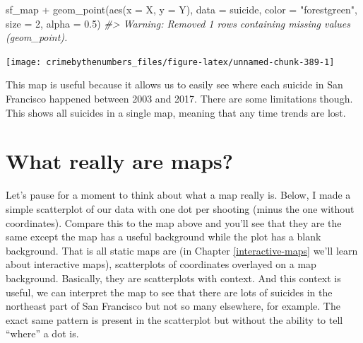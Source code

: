 \documentclass[
]{krantz}
\makeatletter
\newenvironment{Shaded}{\begin{snugshade}}{\end{snugshade}}
\newcommand{\AttributeTok}[1]{\textcolor[rgb]{0.61,0.61,0.61}{#1}}
\newcommand{\CommentTok}[1]{\textcolor[rgb]{0.37,0.37,0.37}{\textit{#1}}}
\newcommand{\DecValTok}[1]{\textcolor[rgb]{0.06,0.06,0.06}{#1}}
\newcommand{\FloatTok}[1]{\textcolor[rgb]{0.06,0.06,0.06}{#1}}
\newcommand{\FunctionTok}[1]{\textcolor[rgb]{0,0,0}{#1}}
\newcommand{\NormalTok}[1]{#1}
\newcommand{\SpecialCharTok}[1]{\textcolor[rgb]{0,0,0}{#1}}
\newcommand{\StringTok}[1]{\textcolor[rgb]{0.5,0.5,0.5}{#1}}
\newenvironment{kframe}{%
\medskip{}
\setlength{\fboxsep}{.8em}
 \def\at@end@of@kframe{}%
 \ifinner\ifhmode%
  \def\at@end@of@kframe{\end{minipage}}%
  \begin{minipage}{\columnwidth}%
 \fi\fi%
 \def\FrameCommand##1{\hskip\@totalleftmargin \hskip-\fboxsep
 \colorbox{shadecolor}{##1}\hskip-\fboxsep
     \hskip-\linewidth \hskip-\@totalleftmargin \hskip\columnwidth}%
 \MakeFramed {\advance\hsize-\width
   \@totalleftmargin\z@ \linewidth\hsize
   \@setminipage}}%
 {\par\unskip\endMakeFramed%
 \at@end@of@kframe}
\renewenvironment{Shaded}{\begin{kframe}}{\end{kframe}}
\makeatother
\begin{document}
\begin{Shaded}
\begin{Highlighting}[]
\NormalTok{sf\_map }\SpecialCharTok{+}
  \FunctionTok{geom\_point}\NormalTok{(}\FunctionTok{aes}\NormalTok{(}\AttributeTok{x =}\NormalTok{ X, }\AttributeTok{y =}\NormalTok{ Y),}
             \AttributeTok{data  =}\NormalTok{ suicide,}
             \AttributeTok{color =} \StringTok{"forestgreen"}\NormalTok{,}
             \AttributeTok{size  =} \DecValTok{2}\NormalTok{,}
             \AttributeTok{alpha =} \FloatTok{0.5}\NormalTok{)}
\CommentTok{\#\textgreater{} Warning: Removed 1 rows containing missing values (geom\_point).}
\end{Highlighting}
\end{Shaded}

\begin{center}\texttt{[image: crimebythenumbers\_files/figure-latex/unnamed-chunk-389-1]} \end{center}

This map is useful because it allows us to easily see where each suicide in San Francisco happened between 2003 and 2017. There are some limitations though. This shows all suicides in a single map, meaning that any time trends are lost.

\hypertarget{what-really-are-maps}{%
\section{What really are maps?}\label{what-really-are-maps}}

Let's pause for a moment to think about what a map really is. Below, I made a simple scatterplot of our data with one dot per shooting (minus the one without coordinates). Compare this to the map above and you'll see that they are the same except the map has a useful background while the plot has a blank background. That is all static maps are (in Chapter \ref{interactive-maps} we'll learn about interactive maps), scatterplots of coordinates overlayed on a map background. Basically, they are scatterplots with context. And this context is useful, we can interpret the map to see that there are lots of suicides in the northeast part of San Francisco but not so many elsewhere, for example. The exact same pattern is present in the scatterplot but without the ability to tell ``where'' a dot is.

\begin{Shaded}
\end{Shaded}
\end{document}
